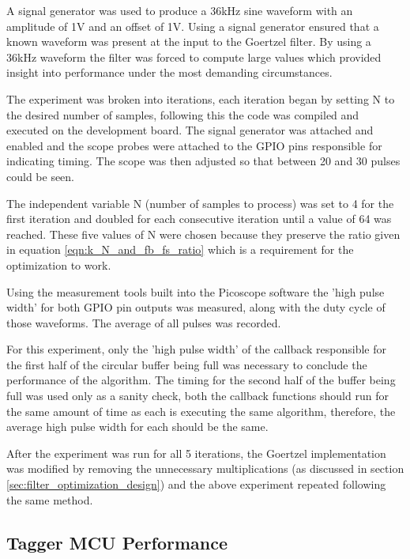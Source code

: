 A signal generator was used to produce a 36kHz sine waveform with an amplitude of 1V and an offset of 1V. Using a signal generator ensured that a known waveform was present at the input to the Goertzel filter. By using a 36kHz waveform the filter was forced to compute large values which provided insight into performance under the most demanding circumstances.

The experiment was broken into iterations, each iteration began by setting N to the desired number of samples, following this the code was compiled and executed on the development board. The signal generator was attached and enabled and the scope probes were attached to the GPIO pins responsible for indicating timing. The scope was then adjusted so that between 20 and 30 pulses could be seen. 

The independent variable N (number of samples to process) was set to 4 for the first iteration and doubled for each consecutive iteration until a value of 64 was reached. These five values of N were chosen because they preserve the ratio given in equation \ref{eqn:k_N_and_fb_fs_ratio} which is a requirement for the optimization to work.

Using the measurement tools built into the Picoscope software the 'high pulse width' for both GPIO pin outputs was measured, along with the duty cycle of those waveforms. The average of all pulses was recorded.

For this experiment, only the 'high pulse width' of the callback responsible for the first half of the circular buffer being full was necessary to conclude the performance of the algorithm. The timing for the second half of the buffer being full was used only as a sanity check, both the callback functions should run for the same amount of time as each is executing the same algorithm, therefore, the average high pulse width for each should be the same.

After the experiment was run for all 5 iterations, the Goertzel implementation was modified by removing the unnecessary multiplications (as discussed in section \ref{sec:filter_optimization_design}) and the above experiment repeated following the same method.







\subsection{Tagger MCU Performance}

